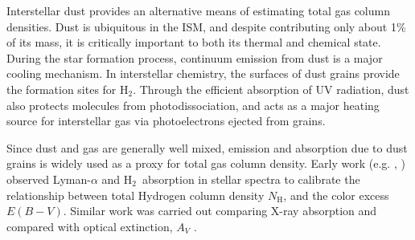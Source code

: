 \documentclass[preprint]{emulateapj}
\def\av{$A_{V}$}
\def\h2{H$_2$}
\def\NH{$N_\mathrm{H}$}
\begin{document}
Interstellar dust provides an alternative means of estimating total gas column densities. Dust is ubiquitous in the ISM, and 
despite contributing only about 1\% of its mass, it is critically important to both its thermal and chemical state. During the star formation process, continuum emission from dust is a major cooling mechanism. %
In interstellar chemistry, the surfaces of dust grains provide the formation sites for \h2. %
Through the efficient absorption of UV radiation, dust %
also protects molecules from photodissociation, and acts as a major heating source for interstellar gas via photoelectrons ejected from grains.

Since dust and gas are generally %
well mixed, emission and absorption due to dust grains is widely used as %
a proxy for total gas column density. Early work (e.g. \citealt{Savage1972}, \citealt{Bohlin1978}) observed Lyman-$\alpha$ and \h2\ absorption in stellar spectra to calibrate the relationship between total Hydrogen column density \NH, and the color excess $E(B-V)$. Similar work was carried out comparing X-ray absorption and compared with optical extinction, $A_V$ \citet{Reina1973, Gorenstein1975}. %
\end{document}
